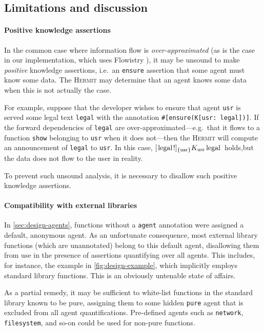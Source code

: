 \documentclass[letterpaper,twocolumn,10pt]{article}
\newcommand{\mlstinline}[1]{\ensuremath{\text{\lstinline{#1}}}}
\newcommand{\Hermit}{\textsc{Hermit}\xspace}
\begin{document}
\subsection{Limitations and discussion}
\label{sec:design-limitations}

\paragraph{Positive knowledge assertions}
In the common case where information flow is \emph{over-approximated} (as is the case in our implementation, which uses Flowistry \cite{crichton_2022a}), it may be unsound to make \emph{positive} knowledge assertions, i.e.\ an \lstinline{ensure} assertion that some agent must know some data.
The \Hermit{} may determine that an agent knows some data when this is not actually the case.

For example, suppose that the developer wishes to ensure that agent \lstinline{usr} is served some legal text \lstinline{legal} with the annotation \lstinline{#[ensure(K[usr: legal])]}.
If the forward dependencies of \lstinline{legal} are over-approximated---e.g.\ that it flows to a function \lstinline{show} belonging to \lstinline{usr} when it does not---then the \Hermit{} will compute an announcement of \lstinline{legal} to \lstinline{usr}.
In this case, \([\mlstinline{legal}!]_{\{\mlstinline{usr}\}} K_{\mlstinline{usr}} \mlstinline{legal}\) holds,but the data does not flow to the user in reality.

To prevent such unsound analysis, it is necessary to disallow such positive knowledge assertions.

\paragraph{Compatibility with external libraries}
In \cref{sec:design-agents}, functions without a \lstinline{agent} annotation were assigned a default, anonymous agent.
As an unfortunate consequence, most external library functions (which are unannotated) belong to this default agent, disallowing them from use in the presence of assertions quantifying over all agents.
This includes, for instance, the example in \cref{fig:design-example}, which implicitly employs standard library functions.
This is an obviously untenable state of affairs.

As a partial remedy, it may be sufficient to white-list functions in the standard library known to be pure, assigning them to some hidden \texttt{\footnotesize pure} agent that is excluded from all agent quantifications.
Pre-defined agents such as \lstinline{network}, \lstinline{filesystem}, and so-on could be used for non-pure functions.
\end{document}

